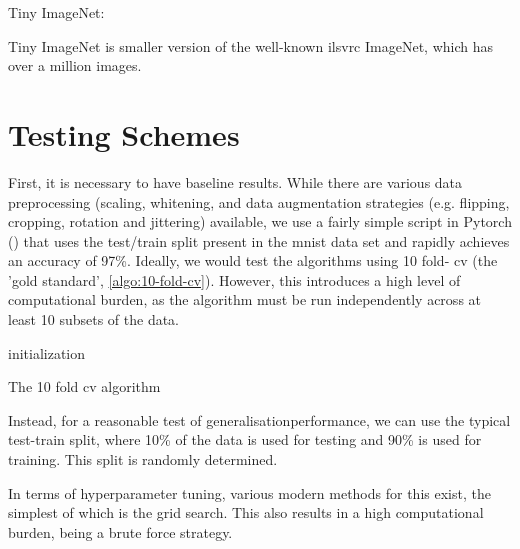 Tiny ImageNet:

Tiny ImageNet is smaller version of the well-known \gls{ilsvrc} ImageNet, which has over a million images.

\section{Testing Schemes}
  
First, it is necessary to have baseline results. While there are various data preprocessing (scaling, whitening,  and data augmentation strategies (e.g. flipping, cropping, rotation and jittering)  available, we use a fairly simple script in Pytorch (\cite{mnist_script}) that uses the test/train split present in the  \gls{mnist} data set and rapidly achieves an accuracy of 97\%. Ideally, we would test the algorithms using 10 fold- \gls{cv} (the 'gold standard', \ref{algo:10-fold-cv}). However, this introduces a high level of computational burden, as the algorithm must be run independently across at least 10 subsets of the data. 
\bigskip

\begin{algorithm}[H]
\SetAlgoLined
{}
 initialization\;
    \caption{The 10 fold \gls{cv} algorithm}
    \label{algo:10-fold-cv}
\end{algorithm}

\bigskip

Instead, for a reasonable test of \gls{generalisationperformance}, we can use the typical test-train split, where 10\% of the data is used for testing and 90\% is used for training. This split is randomly determined.
\bigskip

In terms of \gls{hyperparameter} tuning, various modern methods for this exist, the simplest of which is the grid search. This also results in a high computational burden, being a brute force strategy. 

